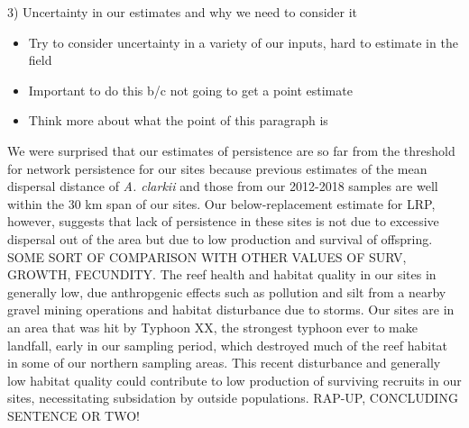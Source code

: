 \documentclass[12pt, oneside]{article}   	%
\begin{document}
3) Uncertainty in our estimates and why we need to consider it
\begin{itemize}
	\item Try to consider uncertainty in a variety of our inputs, hard to estimate in the field
	\item Important to do this b/c not going to get a point estimate
	\item Think more about what the point of this paragraph is
\end{itemize}


We were surprised that our estimates of persistence are so far from the threshold for network persistence for our sites because previous estimates of the mean dispersal distance of \textit{A. clarkii} \citep[10 km][]{pinsky2010using} and those from our 2012-2018 samples \citep[range from XX - XX km for individual-year kernels, XX for all-years kernel, which is used in this analysis]{catalanoInPrepconnectivity} are well within the 30 km span of our sites. Our below-replacement estimate for LRP, however, suggests that lack of persistence in these sites is not due to excessive dispersal out of the area but due to low production and survival of offspring. SOME SORT OF COMPARISON WITH OTHER VALUES OF SURV, GROWTH, FECUNDITY. The reef health and habitat quality in our sites in generally low, due anthropgenic effects such as pollution and silt from a nearby gravel mining operations and habitat disturbance due to storms. Our sites are in an area that was hit by Typhoon XX, the strongest typhoon ever to make landfall, early in our sampling period, which destroyed much of the reef habitat in some of our northern sampling areas. This recent disturbance and generally low habitat quality could contribute to low production of surviving recruits in our sites, necessitating subsidation by outside populations. RAP-UP, CONCLUDING SENTENCE OR TWO!
\end{document}
